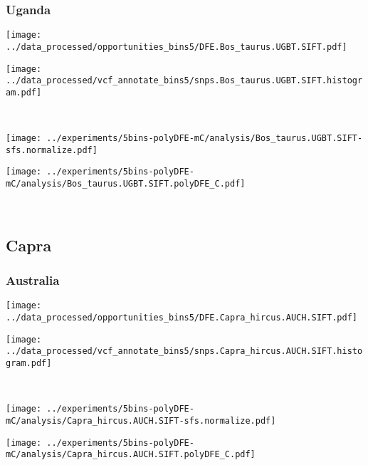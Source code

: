 \subsubsection{Uganda}

\begin{minipage}{0.49\linewidth}
    \texttt{[image: ../data\_processed/opportunities\_bins5/DFE.Bos\_taurus.UGBT.SIFT.pdf]}
\end{minipage}
\begin{minipage}{0.49\linewidth}
    \texttt{[image: ../data\_processed/vcf\_annotate\_bins5/snps.Bos\_taurus.UGBT.SIFT.histogram.pdf]}
\end{minipage}
\\
\begin{minipage}{0.49\linewidth}
    \texttt{[image: ../experiments/5bins-polyDFE-mC/analysis/Bos\_taurus.UGBT.SIFT-sfs.normalize.pdf]}
\end{minipage}
\begin{minipage}{0.49\linewidth}
    \texttt{[image: ../experiments/5bins-polyDFE-mC/analysis/Bos\_taurus.UGBT.SIFT.polyDFE\_C.pdf]}
\end{minipage}
\\

\subsection{Capra}

\subsubsection{Australia}

\begin{minipage}{0.49\linewidth}
    \texttt{[image: ../data\_processed/opportunities\_bins5/DFE.Capra\_hircus.AUCH.SIFT.pdf]}
\end{minipage}
\begin{minipage}{0.49\linewidth}
    \texttt{[image: ../data\_processed/vcf\_annotate\_bins5/snps.Capra\_hircus.AUCH.SIFT.histogram.pdf]}
\end{minipage}
\\
\begin{minipage}{0.49\linewidth}
    \texttt{[image: ../experiments/5bins-polyDFE-mC/analysis/Capra\_hircus.AUCH.SIFT-sfs.normalize.pdf]}
\end{minipage}
\begin{minipage}{0.49\linewidth}
    \texttt{[image: ../experiments/5bins-polyDFE-mC/analysis/Capra\_hircus.AUCH.SIFT.polyDFE\_C.pdf]}
\end{minipage}
\\

